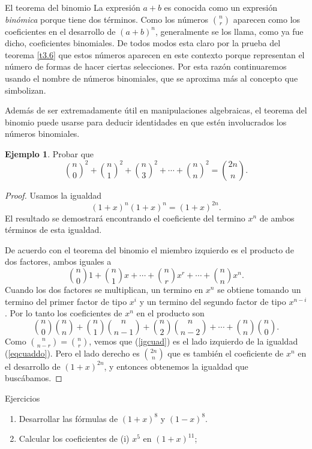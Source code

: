 \documentclass[11pt,spanish,makeidx]{amsbook}
\theoremstyle{definition}
\newtheorem{ejemplo}{Ejemplo}[section]
\theoremstyle{remark}
\begin{document}
\begin{section}{El teorema del binomio}
La expresión $a+b$ es conocida como un expresión {\it binómica} porque tiene dos términos. Como los números   $\binom{n}{r}$ aparecen como los coeficientes en el desarrollo de $(a+b)^n$, generalmente se los llama, como ya fue dicho,  coeficientes binomiales.   De todos modos esta claro por la prueba del teorema \ref{t3.6} que estos números aparecen en este contexto porque representan el número de formas de hacer ciertas selecciones. Por esta razón continuaremos usando el nombre de números binomiales,  que se aproxima más al concepto que simbolizan.

Además de ser extremadamente útil en manipulaciones algebraicas, el teorema del binomio puede usarse para deducir identidades en que estén involucrados los números binomiales.

\begin{ejemplo}Probar que
\begin{equation}\label{eqcuaddo}
\binom{n}{0}^2+\binom{n}{1}^2+\binom{n}{3}^2+\cdots+\binom{n}{n}^2=
\binom{2n}{n}.
\end{equation}
\end{ejemplo}
\begin{proof}
Usamos la igualdad
\begin{equation*}\label{eqxn}
(1+x)^n(1+x)^n=(1+x)^{2n}.
\end{equation*}
El resultado se demostrará encontrando el coeficiente del termino $x^n$ de ambos términos de esta igualdad.

De acuerdo con el teorema del binomio el miembro izquierdo es el producto de dos factores, ambos iguales a
$$
\binom{n}{0}1+\binom{n}{1}x+\cdots+\binom{n}{r}x^r+\cdots+\binom{n}{n}x^n.
$$
 Cuando los dos factores se multiplican, un termino en $x^n$ se obtiene tomando un termino del primer factor de tipo $x^i$ y un termino del segundo factor de tipo $x^{n-i}$. Por lo tanto los coeficientes de $x^n$ en el producto son
\begin{equation}\label{igcuad}
\binom{n}{0}\binom{n}{n}+\binom{n}{1}\binom{n}{n-1}+\binom{n}{2}\binom{n}{n-2}+\cdots
+\binom{n}{n}\binom{n}{0}.
\end{equation}
Como $\binom{n}{n-r}=\binom{n}{r}$, vemos que (\ref{igcuad}) es el lado izquierdo de la igualdad (\ref{eqcuaddo}). Pero el lado derecho es $\binom{2n}{n}$ que es también el coeficiente de $x^n$ en el desarrollo de $(1+x)^{2n}$, y entonces obtenemos la igualdad que buscábamos.
\end{proof}

\begin{subsection}{Ejercicios}\label{ej3.6.1}
\begin{enumerate}
\item Desarrollar las fórmulas de $(1+x)^8$ y $(1-x)^8$.
\item Calcular los coeficientes de
(i) $x^5$ en $(1+x)^{11}$;


\end{enumerate}
\end{subsection}
\end{section}
\end{document}
